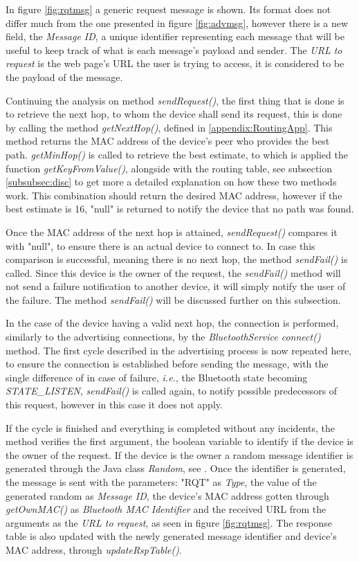 In figure \ref{fig:rqtmsg} a generic request message is shown. Its format does not differ much from the one presented in figure \ref{fig:advmsg}, however there is a new field, the \textit{Message ID}, a unique identifier representing each message that will be useful to keep track of what is each message's payload and sender. The \textit{\gls{URL} to request} is the web page's \gls{URL} the user is trying to access, it is considered to be the payload of the message.

Continuing the analysis on method \textit{sendRequest()}, the first thing that is done is to retrieve the next hop, to whom the device shall send its request, this is done by calling the method \textit{getNextHop()}, defined in \ref{appendix:RoutingApp}. This method returns the \gls{MAC} address of the device's peer who provides the best path. \textit{getMinHop()} is called to retrieve the best estimate, to which is applied the function \textit{getKeyFromValue()}, alongside with the routing table, see subsection \ref{subsubsec:disc} to get more a detailed explanation on how these two methods work. This combination should return the desired \gls{MAC} address, however if the best estimate is 16, "null" is returned to notify the device that no path was found.

Once the \gls{MAC} address of the next hop is attained, \textit{sendRequest()} compares it with "null", to ensure there is an actual device to connect to. In case this comparison is successful, meaning there is no next hop, the method \textit{sendFail()} is called. Since this device is the owner of the request, the \textit{sendFail()} method will not send a failure notification to another device, it will simply notify the user of the failure. The method \textit{sendFail()} will be discussed further on this subsection.

In the case of the device having a valid next hop, the connection is performed, similarly to the advertising connections, by the \textit{BluetoothService connect()} method. The first cycle described in the advertising process is now repeated here, to ensure the connection is established before sending the message, with the single difference of in case of failure, \textit{i.e.}, the Bluetooth state becoming \textit{STATE\_LISTEN}, \textit{sendFail()} is called again, to notify possible predecessors of this request, however in this case it does not apply.

If the cycle is finished and everything is completed without any incidents, the method verifies the first argument, the boolean variable to identify if the device is the owner of the request. If the device is the owner a random message identifier is generated through the Java class \textit{Random}, see \cite{random}. Once the identifier is generated, the message is sent with the parameters: "RQT" as \textit{Type}, the value of the generated random as \textit{Message ID}, the device's \gls{MAC} address gotten through \textit{getOwnMAC()} as \textit{Bluetooth MAC Identifier} and the received \gls{URL} from the arguments as the \textit{\gls{URL} to request}, as seen in figure \ref{fig:rqtmsg}. The response table is also updated with the newly generated message identifier and device's \gls{MAC} address, through \textit{updateRspTable()}.


